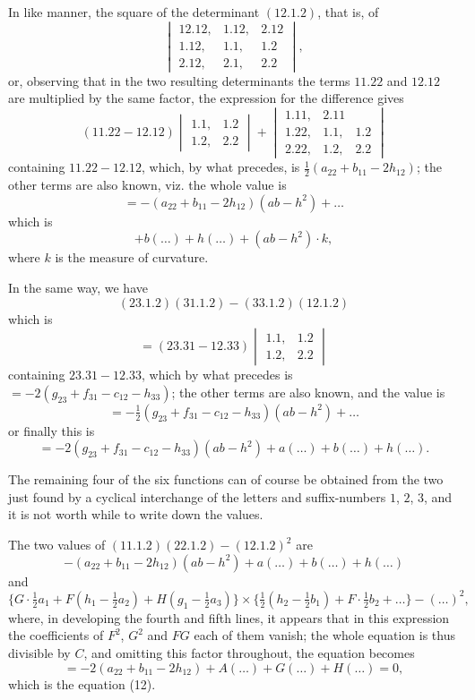 \documentclass[11pt,a4paper]{book}
\begin{document}
In like manner, the square of the determinant $(12.1.2)$, that is, of
\[
\begin{vmatrix}
12.12, & 1.12, & 2.12 \\
1.12, & 1.1, & 1.2 \\
2.12, & 2.1, & 2.2
\end{vmatrix},
\]
or, observing that in the two resulting determinants the terms $11.22$ and $12.12$ are multiplied by the same factor, the expression for the difference gives
\[
(11.22 - 12.12)
\begin{vmatrix}
1.1, & 1.2 \\
1.2, & 2.2
\end{vmatrix}
+
\begin{vmatrix}
1.11, & 2.11 \\
1.22, & 1.1, & 1.2 \\
2.22, & 1.2, & 2.2
\end{vmatrix}
\]
containing $11.22 - 12.12$, which, by what precedes, is $\tfrac{1}{2}(a_{22} + b_{11} - 2h_{12})$; the other terms are also known, viz. the whole value is
\[
= -(a_{22} + b_{11} - 2h_{12})(ab - h^2) + \ldots
\]
which is
\[
+ b(\ldots) + h(\ldots) + (ab - h^2) \cdot k,
\]
where $k$ is the measure of curvature.

In the same way, we have
\[
(23.1.2)(31.1.2) - (33.1.2)(12.1.2)
\]
which is
\[
= (23.31 - 12.33)
\begin{vmatrix}
1.1, & 1.2 \\
1.2, & 2.2
\end{vmatrix}
\]
containing $23.31 - 12.33$, which by what precedes is $= -2(g_{23} + f_{31} - c_{12} - h_{33})$; the other terms are also known, and the value is
\[
= -\tfrac{1}{2}(g_{23} + f_{31} - c_{12} - h_{33})(ab - h^2) + \ldots
\]
or finally this is
\[
= -2(g_{23} + f_{31} - c_{12} - h_{33})(ab - h^2) + a(\ldots) + b(\ldots) + h(\ldots).
\]

The remaining four of the six functions can of course be obtained from the two just found by a cyclical interchange of the letters and suffix-numbers $1$, $2$, $3$, and it is not worth while to write down the values.

The two values of $(11.1.2)(22.1.2) - (12.1.2)^2$ are
\[
- (a_{22} + b_{11} - 2h_{12})(ab - h^2) + a(\ldots) + b(\ldots) + h(\ldots)
\]
and
\[
\{G \cdot \tfrac{1}{2}a_1 + F(h_1 - \tfrac{1}{2}a_2) + H(g_1 - \tfrac{1}{2}a_3)\} \times \{\tfrac{1}{2}(h_2 - \tfrac{1}{2}b_1) + F \cdot \tfrac{1}{2}b_2 + \ldots\} - (\ldots)^2,
\]
where, in developing the fourth and fifth lines, it appears that in this expression the coefficients of $F^2$, $G^2$ and $FG$ each of them vanish; the whole equation is thus divisible by $C$, and omitting this factor throughout, the equation becomes
\[
= -2(a_{22} + b_{11} - 2h_{12}) + A(\ldots) + G(\ldots) + H(\ldots) = 0,
\]
which is the equation (12).
\end{document}

